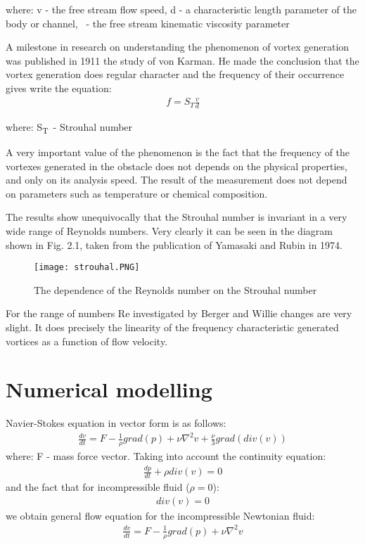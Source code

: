 \documentclass[a4paper,11pt]{article}
\begin{document}
\noindent where: v - the free stream flow speed,  d - a characteristic length parameter of the body or channel, \textnu \ - the free stream kinematic viscosity parameter

\medskip

A milestone in research on understanding
the phenomenon of vortex generation was published in 1911 the study of von Karman. He made the conclusion that the vortex generation does
regular character and the frequency of their occurrence gives write the equation:
\begin{gather*}
  f = S_T\frac{v}{d}
\end{gather*}

\noindent where: S\textsubscript{T}\ - Strouhal number

\medskip

A very important value of the phenomenon is the fact that the frequency of the vortexes generated in the obstacle does not depends on the physical properties, and only on its analysis speed. The result of the measurement does not depend on parameters such as temperature or chemical composition.\par
The results show unequivocally that the Strouhal number is invariant in a very wide range of Reynolds numbers. Very clearly it can be seen in the diagram shown in Fig. 2.1, taken from the publication of Yamasaki and Rubin in 1974.

\begin{figure}[h]
  \centering
  \texttt{[image: strouhal.PNG]}
  \caption{The dependence of the Reynolds number on the Strouhal number}
\end{figure}

For the range of numbers Re investigated by Berger and Willie changes are very slight. It does
precisely the linearity of the frequency characteristic generated vortices as a function of flow velocity.

\section{Numerical modelling}

Navier-Stokes equation in vector form is as follows:
\begin{gather*}
  \frac{dv}{dt} = F - \frac{1}{\rho}grad(p)+\nu\nabla^2v+\frac{\nu}{3}grad(div(v))
\end{gather*}
\noindent where: F - mass force vector.
\medskip
Taking into account the continuity equation:
\begin{gather*}
  \frac{dp}{dt} + \rho div(v) = 0
\end{gather*}
and the fact that for incompressible fluid ($\rho=0$):
\begin{gather*}
  div(v) = 0
\end{gather*}
we obtain general flow equation for the incompressible
Newtonian fluid:
\begin{gather*}
  \frac{dv}{dt} = F - \frac{1}{\rho}grad(p)+\nu\nabla^2v
\end{gather*}
\end{document}

